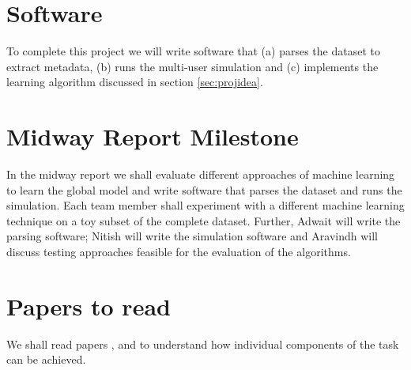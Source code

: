 \documentclass{article} %
\begin{document}
\section{Software}
\vspace{-0.125in}
To complete this project we will write software that (a) parses the dataset to extract metadata, (b) runs the multi-user simulation and (c) implements the learning algorithm discussed in section \ref{sec:projidea}.
\vspace{-0.125in}
\section{Midway Report Milestone}
\vspace{-0.125in}
In the midway report we shall evaluate different approaches of machine learning to learn the global model and write software that parses the dataset and runs the simulation. Each team member shall experiment with a different machine learning technique on a toy subset of the complete dataset. Further, Adwait will write the parsing software; Nitish will write the simulation software and Aravindh will discuss testing approaches feasible for the evaluation of the algorithms.
\vspace{-0.125in}
\section{Papers to read}
\vspace{-0.125in}
We shall read papers \cite{personalizingimagesearchresults}, \cite{lornet} and \cite{Sebastiani:2002:MLA:505282.505283} to understand how individual components of the task can be achieved.
\vspace{-0.125in}


\vspace{-0.125in}
\end{document}
